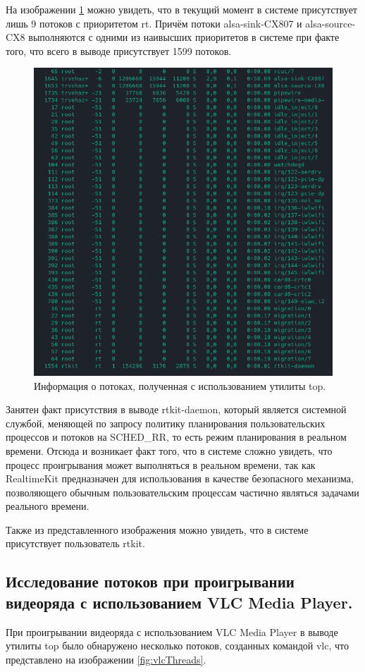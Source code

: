 На изображении \ref{fig:rtThreads} можно увидеть, что в текущий момент в системе присутствует лишь 9 потоков с приоритетом rt. Причём потоки alsa-sink-CX807 и alsa-source-CX8 выполняются с одними из наивысших приоритетов в системе при факте того, что всего в выводе присутствует 1599 потоков.

\begin{figure}[H]
	\centering
	\includegraphics[scale=0.7]{img/rtThreads.png}
	\caption{Информация о потоках, полученная с использованием утилиты top. }
	\label{fig:rtThreads}
\end{figure}

Занятен факт присутствия в выводе rtkit-daemon, который является системной службой, меняющей по запросу политику планирования пользовательских процессов и потоков на SCHED\_RR, то есть режим планирования в реальном времени. Отсюда и возникает факт того, что в системе сложно увидеть, что процесс проигрывания может выполняться в реальном времени, так как RealtimeKit предназначен для использования в качестве безопасного механизма, позволяющего обычным пользовательским процессам частично являться задачами реального времени.

Также из представленного изображения можно увидеть, что в системе присутствует пользователь rtkit.

\subsection{Исследование потоков при проигрывании видеоряда с использованием VLC Media Player. }
При проигрывании видеоряда с использованием VLC Media Player в выводе утилиты top было обнаружено несколько потоков, созданных командой vlc, что представлено на изображении \ref{fig:vlcThreads}.


